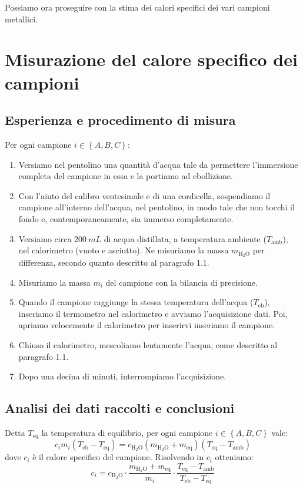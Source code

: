 \documentclass{article}
\newcommand*{\acqua}{{\text{H}_2\text{O}}}
\begin{document}
Possiamo ora proseguire con la stima dei calori specifici dei vari campioni
metallici.

\pagebreak

\section{Misurazione del calore specifico dei campioni}

\subsection{Esperienza e procedimento di misura}

Per ogni campione $i\in\left\{A,B,C\right\}$:

\begin{enumerate}
    \item
        Versiamo nel pentolino una quantità d'acqua tale da permettere l'immersione
        completa del campione in essa e la portiamo ad ebollizione.
    \item
        Con l'aiuto del calibro ventesimale e di una cordicella, sospendiamo il
        campione all'interno dell'acqua, nel pentolino, in modo tale che non tocchi
        il fondo e, contemporaneamente, sia immerso completamente.
    \item
        Versiamo circa $\qty{200}{mL}$ di acqua distillata, a temperatura ambiente
        ($T_\text{amb}$), nel calorimetro (vuoto e asciutto).
        Ne misuriamo la massa $m_\acqua$ per differenza, secondo quanto descritto
        al paragrafo 1.1.
    \item
        Misuriamo la massa $m_i$ del campione con la bilancia di precisione.
    \item
        Quando il campione raggiunge la stessa temperatura dell'acqua ($T_\text{eb}$),
        inseriamo il termometro nel calorimetro e avviamo l'acquisizione dati.
        Poi, apriamo velocemente il calorimetro per inserirvi inseriamo il campione.
    \item
        Chiuso il calorimetro, mescoliamo lentamente l'acqua,
        come descritto al paragrafo 1.1.
    \item
        Dopo una decina di minuti, interrompiamo l'acquisizione.
\end{enumerate}

\subsection{Analisi dei dati raccolti e conclusioni}
Detta $T_\text{eq}$ la temperatura di equilibrio, per ogni campione
$i\in\left\{A,B,C\right\}$ vale:
\[
    c_i m_i (T_\text{eb} - T_\text{eq}) =
    c_\acqua (m_\acqua + m_\text{eq}) (T_\text{eq} - T_\text{amb})
\]
dove $c_i$ è il calore specifico del campione. Risolvendo in $c_i$ otteniamo:
\[
    c_i = c_\acqua\cdot\frac{m_\acqua + m_\text{eq}}{m_i}
          \cdot\frac{T_\text{eq} - T_\text{amb}}{T_\text{eb} - T_\text{eq}}
\]
\end{document}
